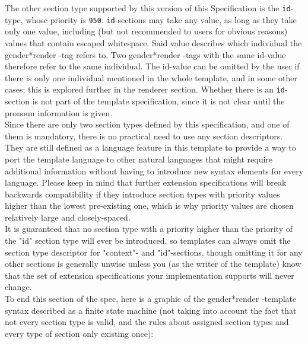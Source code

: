 \documentclass{article}
\newcommand{\GenderRender}{
    gender*render
}
\begin{document}
    The other section type supported by this version of this Specification is the \texttt{id}-type, whose priority is \texttt{950}.
    \texttt{id}-sections may take any value, as long as they take only one value, including (but not recommended to users for obvious reasons) values that contain escaped whitespace.
    Said value describes which individual the \GenderRender-tag refers to.
    Two \GenderRender-tags with the same id-value therefore refer to the same individual.
    The id-value can be omitted by the user if there is only one individual mentioned in the whole template, and in some other cases;
    this is explored further in the renderer section.
    Whether there is an \texttt{id}-section is not part of the template specification, since it is not clear until the pronoun information is given.\\

    Since there are only two section types defined by this specification, and one of them is mandatory, there is no practical need to use any section descriptors.
    They are still defined as a language feature in this template to provide a way to port the template language to other natural languages that might require additional information without having to introduce new syntax elements for every language.
    Please keep in mind that further extension specifications will break backwards compatibility if they introduce section types with priority values higher than the lowest pre-existing one, which is why priority values are chosen relatively large and closely-spaced.\\
    It is guaranteed that no section type with a priority higher than the priority of the "id" section type will ever be introduced, so templates can always omit the section type descriptor for "context"- and "id"-sections, though omitting it for any other sections is generally unwise unless you (as the writer of the template) know that the set of extension specifications your implementation supports will never change.\\

    To end this section of the spec, here is a graphic of the \GenderRender-template syntax described as a finite state machine (not taking into account the fact that not every section type is valid, and the rules about assigned section types and every type of section only existing once):\\
\end{document}
